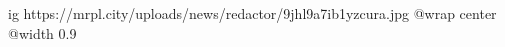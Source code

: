  
 
 
 
 

\ifcmt
  ig https://mrpl.city/uploads/news/redactor/9jhl9a7ib1yzcura.jpg
  @wrap center
  @width 0.9
\fi
